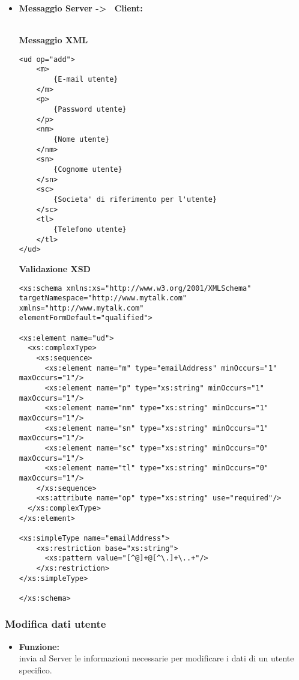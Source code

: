 {{\begin{itemize}
{\begin{lstlisting}
<xs:simpleType name="emailAddress"> 
    <xs:restriction base="xs:string"> 
      <xs:pattern value="[^@]+@[^\.]+\..+"/> 
    </xs:restriction> 
</xs:simpleType> 

</xs:schema>
				\end{lstlisting}
				}
				
				\item[] \textbf{Messaggio Server -\textgreater~ Client:}{\\
				\textbf{Messaggio XML}\\
				\begin{lstlisting}
<ud op="add">
	<m>
		{E-mail utente}
	</m>
	<p>
		{Password utente}
	</p>
	<nm>
		{Nome utente}
	</nm>
	<sn>
		{Cognome utente}
	</sn>
	<sc>
		{Societa' di riferimento per l'utente}
	</sc>
	<tl>
		{Telefono utente}
	</tl>
</ud>
				\end{lstlisting}
				\textbf{Validazione XSD}\\
				\begin{lstlisting}
<xs:schema xmlns:xs="http://www.w3.org/2001/XMLSchema"
targetNamespace="http://www.mytalk.com"
xmlns="http://www.mytalk.com"
elementFormDefault="qualified">

<xs:element name="ud">
  <xs:complexType>
    <xs:sequence>
      <xs:element name="m" type="emailAddress" minOccurs="1" maxOccurs="1"/>
      <xs:element name="p" type="xs:string" minOccurs="1" maxOccurs="1"/>
      <xs:element name="nm" type="xs:string" minOccurs="1" maxOccurs="1"/>
      <xs:element name="sn" type="xs:string" minOccurs="1" maxOccurs="1"/>
      <xs:element name="sc" type="xs:string" minOccurs="0" maxOccurs="1"/>
      <xs:element name="tl" type="xs:string" minOccurs="0" maxOccurs="1"/>
    </xs:sequence>
    <xs:attribute name="op" type="xs:string" use="required"/>
  </xs:complexType>
</xs:element>

<xs:simpleType name="emailAddress"> 
    <xs:restriction base="xs:string"> 
      <xs:pattern value="[^@]+@[^\.]+\..+"/> 
    </xs:restriction> 
</xs:simpleType> 

</xs:schema>
				\end{lstlisting}
				}
		\end{itemize}
	}%
	
		\subsubsection{Modifica dati utente}{
	\label{opUMod}
		\begin{itemize}
			\item[] \textbf{Funzione:}{\\
				invia al Server le informazioni necessarie per modificare i dati di un utente specifico.
				}
			

\end{itemize}}}
